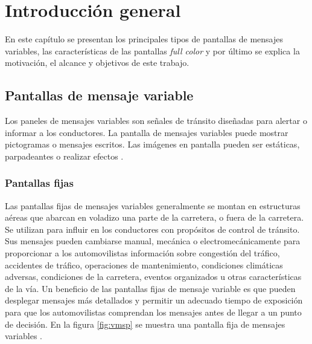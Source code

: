 
\chapter{Introducción general} %

\label{Chapter1} %
\label{IntroGeneral}
En este capítulo se presentan los principales tipos de pantallas de mensajes variables, las características de las pantallas \textit{full color} y por último se explica la motivación, el alcance y objetivos de este trabajo.

\newcommand{\keyword}[1]{\textbf{#1}}
\newcommand{\tabhead}[1]{\textbf{#1}}
\newcommand{\code}[1]{\texttt{#1}}
\newcommand{\file}[1]{\texttt{\bfseries#1}}
\newcommand{\option}[1]{\texttt{\itshape#1}}
\newcommand{\grados}{$^{\circ}$}



\section{Pantallas de mensaje variable}

Los paneles de mensajes variables son señales de tránsito diseñadas para alertar o informar a los conductores. La pantalla de mensajes variables puede mostrar pictogramas o mensajes escritos. Las imágenes en pantalla pueden ser estáticas, parpadeantes o realizar efectos \cite{WIKIVMS}.


\subsection{Pantallas fijas}

Las pantallas fijas de mensajes variables generalmente se montan en estructuras aéreas que abarcan en voladizo una parte de la carretera, o fuera de la carretera. Se utilizan para influir en los conductores con propósitos de control de tránsito. Sus mensajes pueden cambiarse manual, mecánica o electromecánicamente para proporcionar a los automovilistas información sobre congestión del tráfico, accidentes de tráfico, operaciones de mantenimiento, condiciones climáticas adversas, condiciones de la carretera, eventos organizados u otras características de la vía. Un beneficio de las pantallas fijas de mensaje variable es que pueden desplegar mensajes más detallados y permitir un adecuado tiempo de exposición  para que los automovilistas comprendan los mensajes antes de llegar a un punto de decisión. En la figura \ref{fig:vmsp} se muestra una pantalla fija de mensajes variables \citep{VMSTYPES}.



